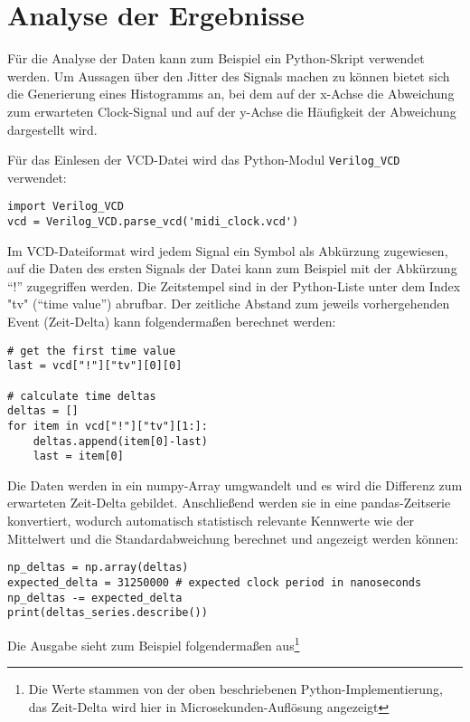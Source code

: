 \section{Analyse der Ergebnisse}
\label{ch:Anwendungsfall:sec:Analyse}

Für die Analyse der Daten kann zum Beispiel ein Python-Skript verwendet werden. Um Aussagen über den Jitter des Signals machen zu können bietet sich die Generierung eines Histogramms an, bei dem auf der x-Achse die Abweichung zum erwarteten Clock-Signal und auf der y-Achse die Häufigkeit der Abweichung dargestellt wird.

Für das Einlesen der VCD-Datei wird das Python-Modul {\tt Verilog\_VCD} verwendet:
\begin{verbatim}
import Verilog_VCD
vcd = Verilog_VCD.parse_vcd('midi_clock.vcd')
\end{verbatim}

Im VCD-Dateiformat wird jedem Signal ein Symbol als Abkürzung zugewiesen, auf die Daten des ersten Signals der Datei kann zum Beispiel mit der Abkürzung ``!'' zugegriffen werden.
Die Zeitstempel sind in der Python-Liste unter dem Index "tv" (``time value'') abrufbar. 
Der zeitliche Abstand zum jeweils vorhergehenden Event (Zeit-Delta) kann folgendermaßen berechnet werden:
 
\begin{verbatim}
# get the first time value
last = vcd["!"]["tv"][0][0]

# calculate time deltas
deltas = []
for item in vcd["!"]["tv"][1:]: 
    deltas.append(item[0]-last)
    last = item[0]
\end{verbatim}

Die Daten werden in ein numpy-Array umgwandelt und es wird die Differenz zum erwarteten Zeit-Delta gebildet. 
Anschließend werden sie in eine pandas-Zeitserie konvertiert, wodurch automatisch statistisch relevante Kennwerte wie der Mittelwert und die Standardabweichung berechnet und angezeigt werden können:
 
\begin{verbatim}
np_deltas = np.array(deltas)
expected_delta = 31250000 # expected clock period in nanoseconds
np_deltas -= expected_delta
print(deltas_series.describe())
\end{verbatim}

Die Ausgabe sieht zum Beispiel folgendermaßen aus\footnote{Die Werte stammen von der oben beschriebenen Python-Implementierung, das Zeit-Delta wird hier in Microsekunden-Auflösung angezeigt}

